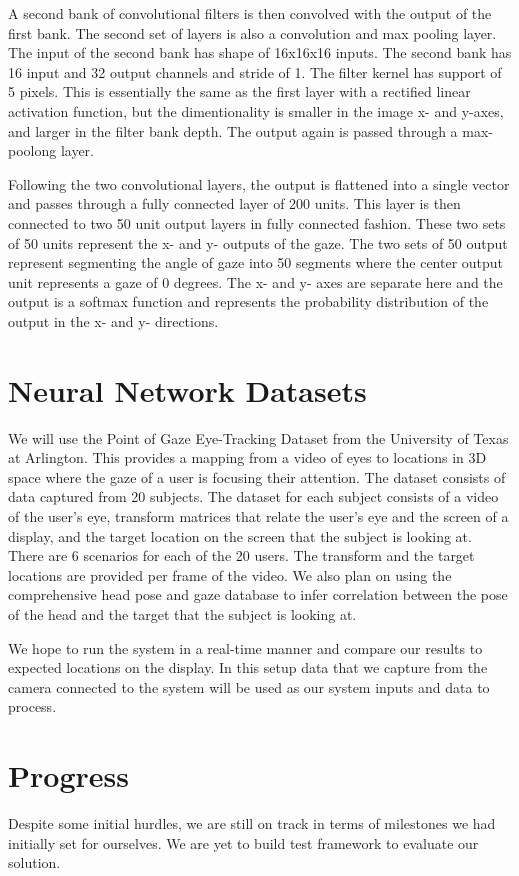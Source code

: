 \documentclass[10pt,twocolumn,letterpaper]{article}
\begin{document}
A second bank of convolutional filters is then convolved with the
output of the first bank. The second set of layers is also a
convolution and max pooling layer. The input of the second bank has
shape of 16x16x16 inputs. The second bank has 16 input and 32 output
channels and stride of 1. The filter kernel has support of 5
pixels. This is essentially the same as the first layer with a
rectified linear activation function, but the dimentionality is
smaller in the image x- and y-axes, and larger in the filter bank
depth. The output again is passed through a max-poolong layer.

Following the two convolutional layers, the output is flattened into a
single vector and passes through a fully connected layer of 200
units. This layer is then connected to two 50 unit output layers in
fully connected fashion. These two sets of 50 units represent the x-
and y- outputs of the gaze. The two sets of 50 output represent
segmenting the angle of gaze into 50 segments where the center output
unit represents a gaze of 0 degrees. The x- and y- axes are separate
here and the output is a softmax function and represents the
probability distribution of the output in the x- and y- directions.

\section{Neural Network Datasets}
We will use the Point of Gaze Eye-Tracking Dataset from the University
of Texas at Arlington\cite{eyetracking}. This provides a mapping from
a video of eyes to locations in 3D space where the gaze of a user is
focusing their attention. The dataset consists of data captured from
20 subjects. The dataset for each subject consists of a video of the
user’s eye, transform matrices that relate the user’s eye and the
screen of a display, and the target location on the screen that the
subject is looking at. There are 6 scenarios for each of the 20
users. The transform and the target locations are provided per frame
of the video. We also plan on using the comprehensive head pose and
gaze database\cite{mcmourrough} to infer correlation between the pose
of the head and the target that the subject is looking at.

We hope to run the system in a real-time manner and compare our
results to expected locations on the display. In this setup data that
we capture from the camera connected to the system will be used as our
system inputs and data to process.

\section{Progress}
Despite some initial hurdles, we are still on track in terms of milestones 
we had initially set for ourselves. We are yet to build test framework 
to evaluate our solution. 
\end{document}
